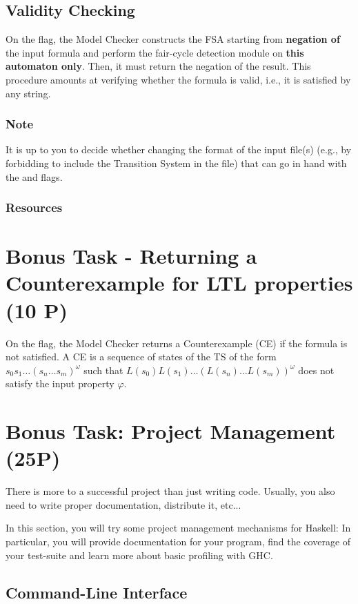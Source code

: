 \documentclass{article}
\begin{document}
\subsection{Validity Checking}
On the  flag, the Model Checker constructs the FSA starting from \textbf{negation of} 
the input formula and perform the fair-cycle detection module on \textbf{this automaton only}. 
Then, it must return the negation of the result.
This procedure amounts at verifying whether the formula is valid, i.e., it is satisfied by any string. 

\subsubsection*{Note}
It is up to you to decide whether changing the format of the input file(s)
(e.g., by forbidding to include the Transition System in the file) 
that can go in hand with the  and  flags.

\subsubsection*{Resources}
\cite[Paragraph 5.2.2]{BaKa}

\section{Bonus Task - Returning a Counterexample for LTL properties (10 P)} \label{sec::bonus2}
On the  flag, the Model Checker returns a Counterexample (CE) if the formula is 
not satisfied. A CE is a sequence of states of the TS of the form $s_0s_1 \dots (s_n \dots s_m )^{\omega}$
such that $L(s_0)L(s_1) \dots (L(s_n) \dots L(s_m) )^{\omega}$ does not satisfy the input property $\varphi$.

\section{Bonus Task: Project Management (25P)}

There is more to a successful project than just writing code. 
Usually, you also need to write proper documentation, distribute it, etc...

In this section, you will try some project management mechanisms for Haskell: 
In particular, you will provide documentation for your program, 
find the coverage of your test-suite and learn more about basic profiling with GHC.

\subsection{Command-Line Interface}
\end{document}
